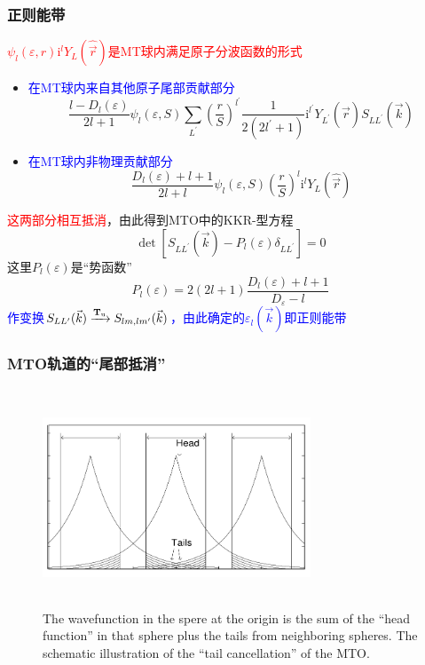 \documentclass[cjk,slidestop,compress,mathserif,blue]{beamer}
\begin{document}
\frame
{
	\frametitle{正则能带}
	\textcolor{red}{$\psi_l(\varepsilon,r)\mathrm{i}^lY_L(\hat{\vec r})$是\textrm{MT}球内满足原子分波函数的形式}
	\begin{itemize}
		\item \textcolor{blue}{在\textrm{MT}球内来自其他原子尾部贡献部分}$$\dfrac{l-D_l(\varepsilon)}{2l+1}\psi_l(\varepsilon,S)\sum_{L^{\prime}}\left(\dfrac rS\right)^{l^{\prime}}\dfrac1{2(2l^{\prime}+1)}\mathrm{i}^{l^{\prime}}Y_{L^{\prime}}(\hat{\vec r})S_{LL^{\prime}}(\vec k)$$
		\item \textcolor{blue}{在\textrm{MT}球内非物理贡献部分}$$\dfrac{D_l(\varepsilon)+l+1}{2l+l}\psi_l(\varepsilon,S)\left(\dfrac rS\right)^l\mathrm{i}^lY_L(\hat{\vec r})$$
	\end{itemize}
	\textcolor{red}{这两部分相互抵消}，由此得到\textrm{MTO}中的\textrm{KKR}-型方程
	\begin{displaymath}
		\det[S_{LL^{\prime}}(\vec k)-P_l(\varepsilon)\delta_{LL^{\prime}}]=0
	\end{displaymath}
	这里$P_l(\varepsilon)$是“势函数”
	\begin{displaymath}
		P_l(\varepsilon)=2(2l+1)\dfrac{D_l(\varepsilon)+l+1}{D_{\varepsilon}-l}
	\end{displaymath}
	\textcolor{blue}{作变换$S_{LL^{\prime}}(\vec k)\xrightarrow{\bf{T}\rm{_u}}S_{lm,lm^{\prime}}(\vec k)$，由此确定的$\varepsilon_l(\vec k)$即正则能带}
}

\frame
{
	\frametitle{\textrm{MTO}轨道的“尾部抵消”}
\begin{figure}[h!]
	\vspace*{-0.7in}
\centering
\includegraphics[height=2.55in,width=3.15in,viewport=0 0 845 635,clip]{Figures/MTO-Tail_cancellation.png}
\caption{\tiny \textrm{The wavefunction in the spere at the origin is the sum of the ``head function'' in that sphere plus the tails from neighboring spheres. The schematic illustration of the ``tail cancellation'' of the MTO.}}%
\label{MTO-tail-candellation}
\end{figure}
}
\end{document}
